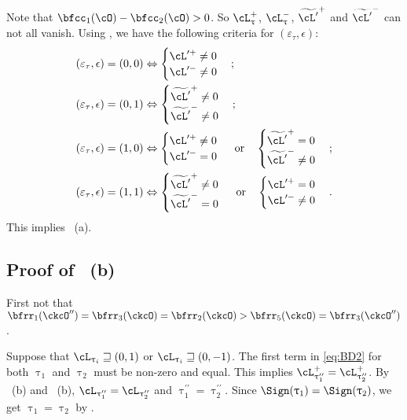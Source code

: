 \documentclass[12pt,a4paper]{amsart}
\numberwithin{equation}{section}
\theoremstyle{remark}
\def\uptaupp{\uptau^{\prime\prime}}
\begin{document}
Note that $\bfcc_{1}(\cO)-\bfcc_{2}(\cO)>0$. So $\pac{\uptau}$, $\nac{\uptau}$,
$\tpac$ and $\tnac$ can not all vanish.
Using , we have the following criteria for
$(\varepsilon_{\tau},\epsilon)$:
\[
\begin{split}
  (\varepsilon_{\tau},\epsilon) = (0,0) & \Leftrightarrow
  \begin{cases} \opac \neq 0\\ \onac \neq 0 \end{cases};\\
  (\varepsilon_{\tau},\epsilon) = (0,1) & \Leftrightarrow
  \begin{cases} \tpac \neq 0\\ \tnac \neq 0 \end{cases};\\
  (\varepsilon_{\tau},\epsilon) = (1,0) & \Leftrightarrow
  \begin{cases} \opac \neq 0 \\ \onac  = 0 \end{cases} \text{ or} \quad
  \begin{cases} \tpac = 0 \\ \tnac  \neq 0 \end{cases}; \\
  (\varepsilon_{\tau},\epsilon) = (1,1) & \Leftrightarrow
  \begin{cases} \tpac \neq 0 \\ \tnac  = 0 \end{cases} \text{ or} \quad
  \begin{cases} \opac = 0 \\ \onac  \neq 0 \end{cases}.
\end{split}
\]
This implies ~(a).


\subsection*{\bf Proof of ~(b) }
First not that
$\bfrr_{1}(\ckcO'') = \bfrr_{3}(\ckcO)=\bfrr_{2}(\ckcO)>\bfrr_{5}(\ckcO) = \bfrr_{3}(\ckcO'')$.

Suppose that  $\ac_{\uptau_{i}} \sqsupseteq (0,1)$ or $\ac_{\uptau_{i}} \sqsupseteq (0,-1)$.
The first term in \eqref{eq:BD2} for both $\uptau_{1}$ and $\uptau_{2}$ must be
non-zero and equal.
This implies $\pac{\uptaupp_{1}}=\pac{\uptaupp_{2}}$.
By ~(b) and ~(b), $\ac_{\uptaupp_{1}} = \ac_{\uptaupp_{2}}$ and  $\uptaupp_{1}=\uptaupp_{2}$.
Since $\Sign(\uptau_{1})=\Sign(\uptau_{2})$, we get
$\uptau_{1}=\uptau_{2}$ by .
\end{document}
